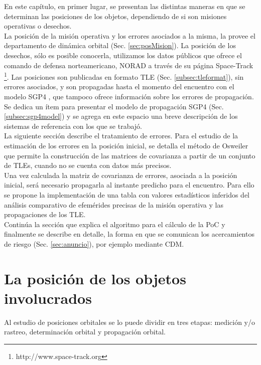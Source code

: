 En este cap\'itulo, en primer lugar, se presentan las distintas maneras en que se determinan las posiciones de los objetos, dependiendo de si son misiones operativas o desechos.\\
La posici\'on de la misi\'on operativa y los errores asociados a la misma, la provee el departamento de din\'amica orbital (Sec. \ref{sec:posMision}).
La posici\'on de los desechos, s\'olo es posible conocerla, utilizamos los datos p\'ublicos que ofrece el comando de defensa norteamericano, \ac{NORAD} a trav\'es de su p\'agina Space-Track {\footnote{http://www.space-track.org}}. Las posiciones son publicadas en formato \ac{TLE} (Sec. \ref{subsec:tleformat}), sin errores asociados, y son propagadas hasta el momento del encuentro con el modelo SGP4  \citep{hoots1980models}, que tampoco ofrece informaci\'on sobre los errores de propagaci\'on. Se dedica un \'item para presentar el modelo de propagaci\'on SGP4 (Sec. \ref{subsec:sgp4model}) y se agrega en este espacio una breve descripci\'on de los sistemas de referencia con los que se trabaj\'o.\\

La siguiente secci\'on describe el tratamiento de errores. Para el estudio de la estimaci\'on de los errores en la posici\'on inicial, se detalla el m\'etodo de Osweiler \citep{osweiler} que permite la construcci\'on de las matrices de covarianza a partir de un conjunto de TLEs, cuando no se cuenta con datos m\'as precisos.\\

Una vez calculada la matriz de covarianza de errores, asociada a la posici\'on inicial, ser\'a necesario propagarla al instante predicho para el encuentro. Para ello se propone la implementaci\'on de una tabla con valores estad\'isticos inferidos del an\'alisis comparativo de efem\'erides precisas de la misi\'on operativa y las propagaciones de los TLE.\\

Contin\'ua la secci\'on que explica el algoritmo para el c\'alculo de la PoC y finalmente se describe en detalle, la forma en que se comunican los acercamientos de riesgo (Sec. \ref{sec:anuncio}), por ejemplo mediante \ac{CDM}.


\section{La posici\'on de los objetos involucrados}{\label{sec:posMision}}
Al estudio de posiciones orbitales se lo puede dividir en tres etapas: medici\'on y/o rastreo, determinaci\'on orbital y propagaci\'on orbital.

